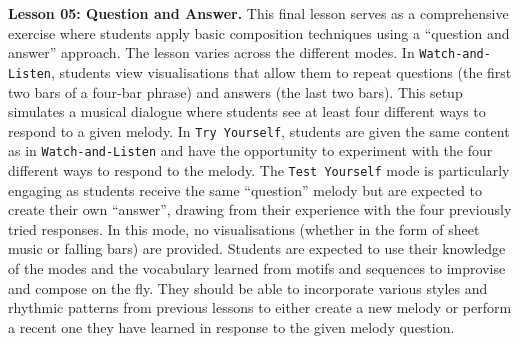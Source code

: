\documentclass{vgtc}                          %
\begin{document}
\par %
\textbf{Lesson 05: Question and Answer.} This final lesson serves as a comprehensive exercise where students apply basic composition techniques using a ``question and answer'' approach. The lesson varies across the different modes. In \texttt{Watch-and-Listen}, students view visualisations that allow them to repeat questions (the first two bars of a four-bar phrase) and answers (the last two bars). This setup simulates a musical dialogue where students see at least four different ways to respond to a given melody. In \texttt{Try Yourself}, students are given the same content as in \texttt{Watch-and-Listen} and have the opportunity to experiment with the four different ways to respond to the melody. The \texttt{Test Yourself} mode is particularly engaging as students receive the same ``question'' melody but are expected to create their own ``answer'', drawing from their experience with the four previously tried responses. In this mode, no visualisations (whether in the form of sheet music or falling bars) are provided. Students are expected to use their knowledge of the modes and the vocabulary learned from motifs and sequences to improvise and compose on the fly. They should be able to incorporate various styles and rhythmic patterns from previous lessons to either create a new melody or perform a recent one they have learned in response to the given melody question.
\end{document}
